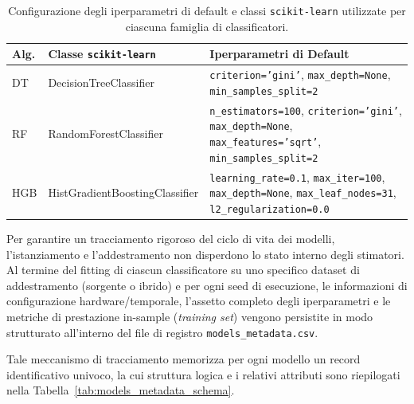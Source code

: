 \begin{table}[H]
    \centering
    \small
    \caption{Configurazione degli iperparametri di default e classi \texttt{scikit-learn} utilizzate per ciascuna famiglia di classificatori.}
    \label{tab:hyperparameters_summary}
    \begin{tabularx}{\textwidth}{l l >{\raggedright\arraybackslash}X}
        \toprule
        \textbf{Alg.} & \textbf{Classe \texttt{scikit-learn}} & \textbf{Iperparametri di Default} \\
        \midrule
        DT & DecisionTreeClassifier & 
        \texttt{criterion='gini'}, 
        \texttt{max\_depth=None}, 
        \texttt{min\_samples\_split=2} \\
        \addlinespace
        RF & RandomForestClassifier & 
        \texttt{n\_estimators=100}, 
        \texttt{criterion='gini'}, 
        \texttt{max\_depth=None}, 
        \texttt{max\_features='sqrt'}, 
        \texttt{min\_samples\_split=2} \\
        \addlinespace
        HGB & HistGradientBoostingClassifier & 
        \texttt{learning\_rate=0.1}, 
        \texttt{max\_iter=100}, 
        \texttt{max\_depth=None}, 
        \texttt{max\_leaf\_nodes=31}, 
        \texttt{l2\_regularization=0.0} \\
        \bottomrule
    \end{tabularx}
\end{table}

Per garantire un tracciamento rigoroso del ciclo di vita dei modelli, l'istanziamento e l'addestramento non disperdono lo stato interno degli stimatori. 
Al termine del fitting di ciascun classificatore su uno specifico dataset di addestramento (sorgente o ibrido) e per ogni seed di esecuzione, le informazioni di configurazione hardware/temporale, l'assetto completo degli iperparametri e le metriche di prestazione in-sample (\textit{training set}) vengono persistite in modo strutturato all'interno del file di registro \texttt{models\_metadata.csv}.

Tale meccanismo di tracciamento memorizza per ogni modello un record identificativo univoco, la cui struttura logica e i relativi attributi sono riepilogati nella Tabella~\ref{tab:models_metadata_schema}.

